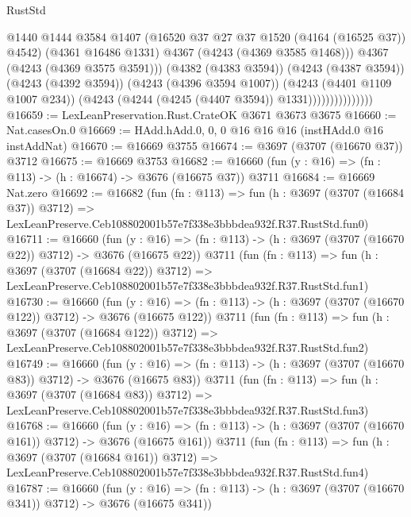 \begin{lexlean}{RustStd}
\begin{coremodule}
                                  @1440
                                  @1444
                                  @3584
                                  @1407
                                  (@16520 @37 @27 @37 @1520 (@4164 (@16525 @37)) @4542)
                                  (@4361 @16486 @1331)
                                  @4367
                                  (@4243 (@4369 @3585 @1468)))
                                @4367
                                (@4243 (@4369 @3575 @3591)))
                              (@4382 (@4383 @3594))
                              (@4243 (@4387 @3594))
                              (@4243 (@4392 @3594))
                              (@4243 (@4396 @3594 @1007))
                              (@4243 (@4401 @1109 @1007 @234))
                              (@4243 (@4244 (@4245 (@4407 @3594)) @1331)))))))))))))))
@16659 := LexLeanPreservation.Rust.CrateOK @3671 @3673 @3675
@16660 := Nat.casesOn.{0}
@16669 := HAdd.hAdd.{0, 0, 0} @16 @16 @16 (instHAdd.{0} @16 instAddNat)
@16670 := @16669 @3755
@16674 := @3697 (@3707 (@16670 @37)) @3712
@16675 := @16669 @3753
@16682 := @16660 (fun (y : @16) => (fn : @113) -> (h : @16674) -> @3676 (@16675 @37)) @3711
@16684 := @16669 Nat.zero
@16692 := @16682
    (fun (fn : @113) =>
    fun (h : @3697 (@3707 (@16684 @37)) @3712) =>
    LexLeanPreserve.Ceb108802001b57e7f338e3bbbdea932f.R37.RustStd.fun0)
@16711 := @16660
    (fun (y : @16) => (fn : @113) -> (h : @3697 (@3707 (@16670 @22)) @3712) -> @3676 (@16675 @22))
    @3711
    (fun (fn : @113) =>
    fun (h : @3697 (@3707 (@16684 @22)) @3712) =>
    LexLeanPreserve.Ceb108802001b57e7f338e3bbbdea932f.R37.RustStd.fun1)
@16730 := @16660
    (fun (y : @16) => (fn : @113) -> (h : @3697 (@3707 (@16670 @122)) @3712) -> @3676 (@16675 @122))
    @3711
    (fun (fn : @113) =>
    fun (h : @3697 (@3707 (@16684 @122)) @3712) =>
    LexLeanPreserve.Ceb108802001b57e7f338e3bbbdea932f.R37.RustStd.fun2)
@16749 := @16660
    (fun (y : @16) => (fn : @113) -> (h : @3697 (@3707 (@16670 @83)) @3712) -> @3676 (@16675 @83))
    @3711
    (fun (fn : @113) =>
    fun (h : @3697 (@3707 (@16684 @83)) @3712) =>
    LexLeanPreserve.Ceb108802001b57e7f338e3bbbdea932f.R37.RustStd.fun3)
@16768 := @16660
    (fun (y : @16) => (fn : @113) -> (h : @3697 (@3707 (@16670 @161)) @3712) -> @3676 (@16675 @161))
    @3711
    (fun (fn : @113) =>
    fun (h : @3697 (@3707 (@16684 @161)) @3712) =>
    LexLeanPreserve.Ceb108802001b57e7f338e3bbbdea932f.R37.RustStd.fun4)
@16787 := @16660
    (fun (y : @16) => (fn : @113) -> (h : @3697 (@3707 (@16670 @341)) @3712) -> @3676 (@16675 @341))

\end{coremodule}
\end{lexlean}
